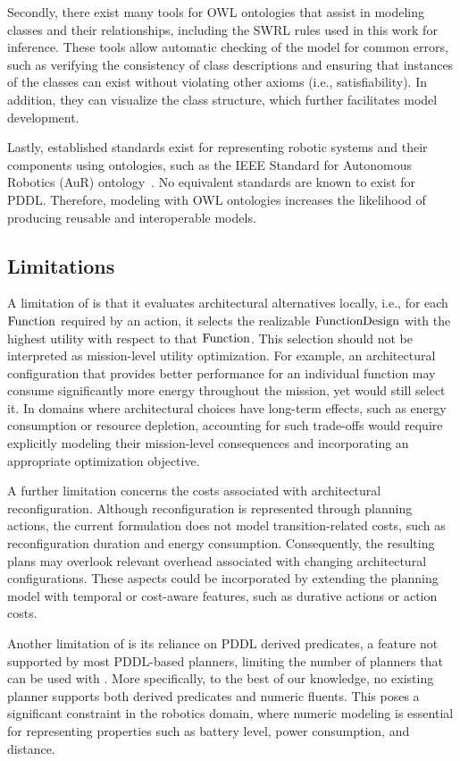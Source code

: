 Secondly, there exist many tools for OWL ontologies that assist in modeling classes and their relationships, including the SWRL rules used in this work for inference. These tools allow automatic checking of the model for common errors, such as verifying the consistency of class descriptions and ensuring that instances of the classes can exist without violating other axioms (i.e., satisfiability). In addition, they can visualize the class structure, which further facilitates model development.

Lastly, established standards exist for representing robotic systems and their components using ontologies, such as the IEEE Standard for Autonomous Robotics (AuR) ontology~\cite{IEEEStandardAutonomous2022}. No equivalent standards are known to exist for PDDL\@. Therefore, modeling with OWL ontologies increases the likelihood of producing reusable and interoperable models.

\subsection{Limitations}\label{planta:sec:limitations}
A limitation of \planta is that it evaluates architectural alternatives locally, i.e., for each $\operatorname{Function}$ required by an action, it selects the realizable $\operatorname{FunctionDesign}$ with the highest utility with respect to that $\operatorname{Function}$. This selection should not be interpreted as mission-level utility optimization. For example, an architectural configuration that provides better performance for an individual function may consume significantly more energy throughout the mission, yet \planta would still select it.
In domains where architectural choices have long-term effects, such as energy consumption or resource depletion, accounting for such trade-offs would require explicitly modeling their mission-level consequences and incorporating an appropriate optimization objective.

A further limitation concerns the costs associated with architectural reconfiguration. Although reconfiguration is represented through planning actions, the current formulation does not model transition-related costs, such as reconfiguration duration and energy consumption. Consequently, the resulting plans may overlook relevant overhead associated with changing architectural configurations. These aspects could be incorporated by extending the planning model with temporal or cost-aware features, such as durative actions or action costs.

Another limitation of \planta is its reliance on PDDL derived predicates, a feature not supported by most PDDL-based planners, limiting the number of planners that can be used with \planta. More specifically, to the best of our knowledge, no existing planner supports both derived predicates and numeric fluents. This poses a significant constraint in the robotics domain, where numeric modeling is essential for representing properties such as battery level, power consumption, and distance.

